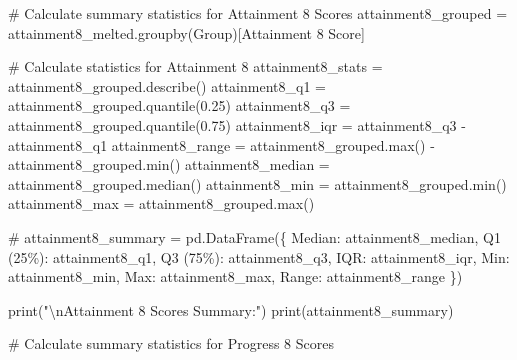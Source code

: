 \documentclass[
  letterpaper,
  DIV=11,
  numbers=noendperiod]{scrartcl}
\newenvironment{Shaded}{\begin{snugshade}}{\end{snugshade}}
\newcommand{\BuiltInTok}[1]{\textcolor[rgb]{0.00,0.23,0.31}{#1}}
\newcommand{\CharTok}[1]{\textcolor[rgb]{0.13,0.47,0.30}{#1}}
\newcommand{\CommentTok}[1]{\textcolor[rgb]{0.37,0.37,0.37}{#1}}
\newcommand{\FloatTok}[1]{\textcolor[rgb]{0.68,0.00,0.00}{#1}}
\newcommand{\NormalTok}[1]{\textcolor[rgb]{0.00,0.23,0.31}{#1}}
\newcommand{\OperatorTok}[1]{\textcolor[rgb]{0.37,0.37,0.37}{#1}}
\newcommand{\StringTok}[1]{\textcolor[rgb]{0.13,0.47,0.30}{#1}}
\begin{document}
\begin{Shaded}
\begin{Highlighting}[]
\CommentTok{\# Calculate summary statistics for Attainment 8 Scores}
\NormalTok{attainment8\_grouped }\OperatorTok{=}\NormalTok{ attainment8\_melted.groupby(}\StringTok{\textquotesingle{}Group\textquotesingle{}}\NormalTok{)[}\StringTok{\textquotesingle{}Attainment 8 Score\textquotesingle{}}\NormalTok{]}

\CommentTok{\# Calculate statistics for Attainment 8}
\NormalTok{attainment8\_stats }\OperatorTok{=}\NormalTok{ attainment8\_grouped.describe()}
\NormalTok{attainment8\_q1 }\OperatorTok{=}\NormalTok{ attainment8\_grouped.quantile(}\FloatTok{0.25}\NormalTok{)}
\NormalTok{attainment8\_q3 }\OperatorTok{=}\NormalTok{ attainment8\_grouped.quantile(}\FloatTok{0.75}\NormalTok{)}
\NormalTok{attainment8\_iqr }\OperatorTok{=}\NormalTok{ attainment8\_q3 }\OperatorTok{{-}}\NormalTok{ attainment8\_q1}
\NormalTok{attainment8\_range }\OperatorTok{=}\NormalTok{ attainment8\_grouped.}\BuiltInTok{max}\NormalTok{() }\OperatorTok{{-}}\NormalTok{ attainment8\_grouped.}\BuiltInTok{min}\NormalTok{()}
\NormalTok{attainment8\_median }\OperatorTok{=}\NormalTok{ attainment8\_grouped.median()}
\NormalTok{attainment8\_min }\OperatorTok{=}\NormalTok{ attainment8\_grouped.}\BuiltInTok{min}\NormalTok{()}
\NormalTok{attainment8\_max }\OperatorTok{=}\NormalTok{ attainment8\_grouped.}\BuiltInTok{max}\NormalTok{()}

\CommentTok{\#}
\NormalTok{attainment8\_summary }\OperatorTok{=}\NormalTok{ pd.DataFrame(\{}
    \StringTok{\textquotesingle{}Median\textquotesingle{}}\NormalTok{: attainment8\_median,}
    \StringTok{\textquotesingle{}Q1 (25\%)\textquotesingle{}}\NormalTok{: attainment8\_q1,}
    \StringTok{\textquotesingle{}Q3 (75\%)\textquotesingle{}}\NormalTok{: attainment8\_q3,}
    \StringTok{\textquotesingle{}IQR\textquotesingle{}}\NormalTok{: attainment8\_iqr,}
    \StringTok{\textquotesingle{}Min\textquotesingle{}}\NormalTok{: attainment8\_min,}
    \StringTok{\textquotesingle{}Max\textquotesingle{}}\NormalTok{: attainment8\_max,}
    \StringTok{\textquotesingle{}Range\textquotesingle{}}\NormalTok{: attainment8\_range}
\NormalTok{\})}

\BuiltInTok{print}\NormalTok{(}\StringTok{"}\CharTok{\textbackslash{}n}\StringTok{Attainment 8 Scores Summary:"}\NormalTok{)}
\BuiltInTok{print}\NormalTok{(attainment8\_summary)}


\CommentTok{\# Calculate summary statistics for Progress 8 Scores}



\end{Highlighting}
\end{Shaded}
\end{document}
